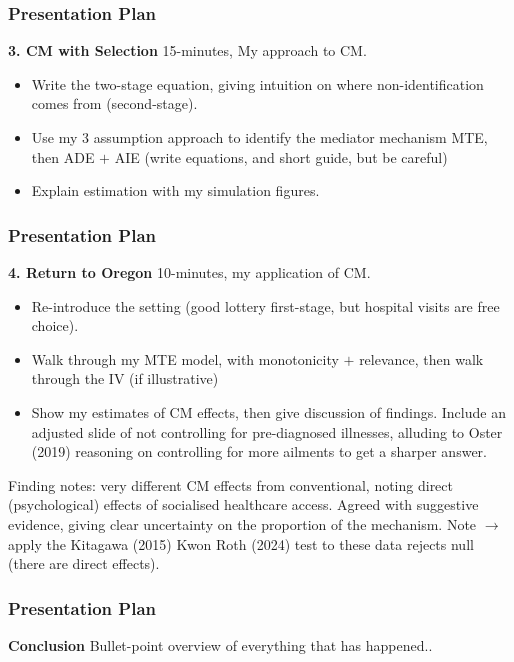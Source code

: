 \documentclass[dvipsnames,handout]{beamer} %
\begin{document}
\begin{frame}
\frametitle{Presentation Plan}
    \textbf{3. CM with Selection}
    15-minutes, My approach to CM.
    \begin{itemize}
        \item Write the two-stage equation, giving intuition on where non-identification comes from (second-stage).
        \item Use my 3 assumption approach to identify the mediator mechanism MTE, then ADE $+$ AIE (write equations, and short guide, but be careful)
        \item Explain estimation with my simulation figures.
    \end{itemize}
\end{frame}
\begin{frame}
\frametitle{Presentation Plan}
    \textbf{4. Return to Oregon}
    10-minutes, my application of CM.
    \begin{itemize}
        \item Re-introduce the setting (good lottery first-stage, but hospital visits are free choice).
        \item Walk through my MTE model, with monotonicity $+$ relevance, then walk through the IV (if illustrative)
        \item Show my estimates of CM effects, then give discussion of findings.  Include an adjusted slide of not controlling for pre-diagnosed illnesses, alluding to Oster (2019) reasoning on controlling for more ailments to get a sharper answer.
    \end{itemize}
    Finding notes: very different CM effects from conventional, noting direct (psychological) effects of socialised healthcare access.
    Agreed with suggestive evidence, giving clear uncertainty on the proportion of the mechanism.
    Note $\to$ apply the Kitagawa (2015) Kwon Roth (2024) test to these data rejects null (there are direct effects). 
\end{frame}
\begin{frame}
\frametitle{Presentation Plan}
    \textbf{Conclusion}
    Bullet-point overview of everything that has happened..
\end{frame}
\end{document}
